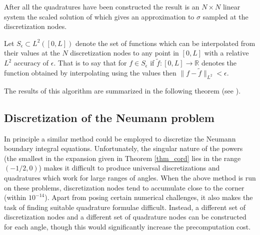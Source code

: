 After all the quadratures have been constructed the result is an $N \times N$ linear system the {\color{olive}scaled} solution of which gives an approximation to $\sigma$ sampled at the discretization nodes. 

\begin{definition}\label{def:seps}
Let $S_\epsilon \subset L^2([0,L])$ denote the set of functions which can be interpolated from their values at the $N$ discretization nodes to any point in $[0,L]$ with a relative $L^2$ accuracy of $\epsilon.$ That is to say that for $f \in S_\epsilon$ if $\tilde{f}:[0,L] \to \mathbb{R}$ denotes the function obtained by interpolating using the values  then $\|f -\tilde{f}\|_{L^2} < \epsilon.$ 
\end{definition}

The results of this algorithm are summarized in the following theorem (see \cite{hoskins2019numerical}).


\subsection{Discretization of the Neumann problem}
In principle a similar method could be employed to discretize the Neumann boundary integral equations. Unfortunately, the singular nature of the powers (the smallest in the expansion given in Theorem \ref{thm_cord} lies in the range $(-1/2,0)$) makes it difficult to produce universal discretizations and quadratures which work for large ranges of angles. When the above method is run on these problems, discretization nodes tend to accumulate close to the corner (within $10^{-14}$). Apart from posing certain numerical challenges, it also makes the task of finding suitable quadrature formulae difficult. Instead, a different set of discretization nodes and a different set of quadrature nodes can be constructed for each angle, though this would significantly increase the precomputation cost.

